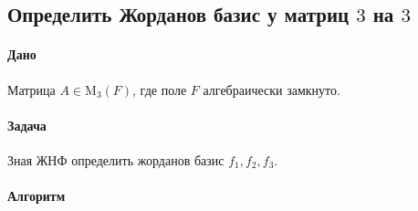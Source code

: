 \documentclass{article}
\newcommand{\Matrix}[2]{\operatorname{\mathrm{M}_{#2}}(#1)}
\begin{document}
\subsection{Определить Жорданов базис у матриц $3$ на $3$}

\paragraph{Дано}

Матрица $A \in \Matrix{F}{3}$, где поле $F$ алгебраически замкнуто.

\paragraph{Задача}

Зная ЖНФ определить жорданов базис $f_1, f_2, f_3$.

\paragraph{Алгоритм}
\end{document}
